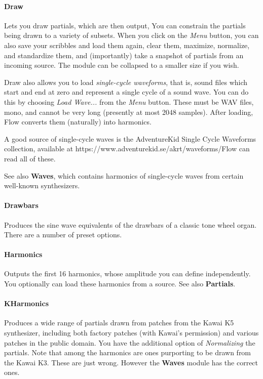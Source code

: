\documentclass{article}
\begin{document}
\paragraph{Draw}   Lets you draw partials, which are then output,   You can constrain the partials being drawn to a variety of subsets.  When you click on the {\it Menu} button, you can also save your scribbles and load them again, clear them, maximize, normalize, and standardize them, and (importantly) take a snapshot of partials from an incoming source.  The module can be collapsed to a smaller size if you wish.

Draw also allows you to load {\it single-cycle waveforms}, that is, sound files which start and end at zero and represent a single cycle of a sound wave.  You can do this by choosing {\it Load Wave...} from the {\it Menu} button.  These must be WAV files, mono, and cannot be very long (presently at most 2048 samples).  After loading, Flow converts them (naturally) into harmonics.

A good source of single-cycle waves is the AdventureKid Single Cycle Waveforms collection, available at https:/\!/www.adventurekid.se/akrt/waveforms/\quad Flow can read all of these.

See also {\bf Waves}, which contains harmonics of single-cycle waves from certain well-known synthesizers.

\paragraph{Drawbars}   Produces the sine wave equivalents of the drawbars of a classic tone wheel organ.  There are a number of preset options.

\paragraph{Harmonics}  Outputs the first 16 harmonics, whose amplitude you can define independently.  You optionally can load these harmonics from a source. See also {\bf Partials}.

\paragraph{KHarmonics}  Produces a wide range of partials drawn from patches from the Kawai K5 synthesizer, including both factory patches (with Kawai's permission) and various patches in the public domain.  You have the additional option of {\it Normalizing} the partials.  Note that among the harmonics are ones purporting to be drawn from the Kawai K3.  These are just wrong.  However the {\bf Waves} module has the correct ones.
\end{document}
